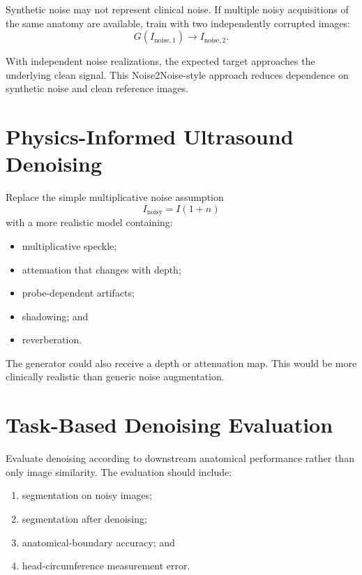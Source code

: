\documentclass[11pt,a4paper]{article}
\begin{document}
Synthetic noise may not represent clinical noise. If multiple noisy acquisitions of the same anatomy are available, train with two independently corrupted images:
\begin{equation}
    G(I_{\mathrm{noise},1}) \longrightarrow I_{\mathrm{noise},2}.
\end{equation}

With independent noise realizations, the expected target approaches the underlying clean signal. This Noise2Noise-style approach reduces dependence on synthetic noise and clean reference images.

\section{Physics-Informed Ultrasound Denoising}

Replace the simple multiplicative noise assumption
\begin{equation}
    I_{\mathrm{noisy}}=I(1+n)
\end{equation}
with a more realistic model containing:
\begin{itemize}
    \item multiplicative speckle;
    \item attenuation that changes with depth;
    \item probe-dependent artifacts;
    \item shadowing; and
    \item reverberation.
\end{itemize}

The generator could also receive a depth or attenuation map. This would be more clinically realistic than generic noise augmentation.

\section{Task-Based Denoising Evaluation}

Evaluate denoising according to downstream anatomical performance rather than only image similarity. The evaluation should include:
\begin{enumerate}
    \item segmentation on noisy images;
    \item segmentation after denoising;
    \item anatomical-boundary accuracy; and
    \item head-circumference measurement error.
\end{enumerate}
\end{document}
